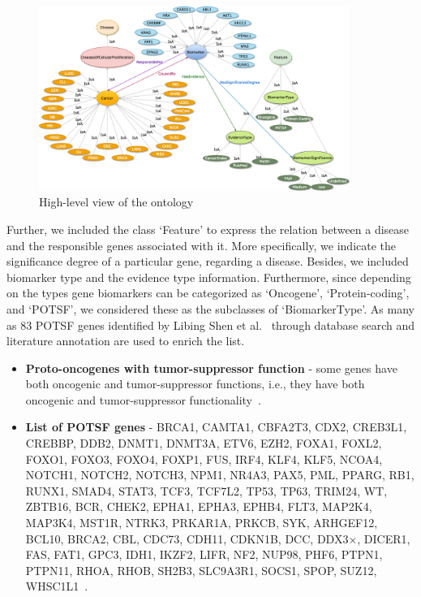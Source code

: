 \begin{figure}
	\centering
	\includegraphics[width=0.8\linewidth,height=60mm]{images/diagram_general_view.png}
	\caption{High-level view of the ontology} 
	\label{fig:main_ontology}
\end{figure}

\hspace*{3.5mm} Further, we included the class `Feature' to express the relation between a disease and the responsible genes associated with it. More specifically, we indicate the significance degree of a particular gene, regarding a disease. Besides, we included biomarker type and the evidence type information. Furthermore, since depending on the types gene biomarkers can be categorized as `Oncogene', `Protein-coding', and `POTSF', we considered these as the subclasses of `BiomarkerType'. As many as 83 POTSF genes identified by Libing Shen et al.~\cite{POSTF} through database search and literature annotation are used to enrich the list. 

\begin{itemize}[noitemsep]
    \item \textbf{Proto-oncogenes with tumor-suppressor function} - some genes have both oncogenic and tumor-suppressor functions, i.e., they have both oncogenic and tumor-suppressor functionality~\cite{POSTF}.
    \item \textbf{List of POTSF genes} - BRCA1, CAMTA1, CBFA2T3, CDX2, CREB3L1, CREBBP, DDB2, DNMT1, DNMT3A, ETV6, EZH2, FOXA1, FOXL2, FOXO1, FOXO3, FOXO4, FOXP1, FUS, IRF4, KLF4, KLF5, NCOA4, NOTCH1, NOTCH2, NOTCH3, NPM1, NR4A3, PAX5, PML, PPARG, RB1, RUNX1, SMAD4, STAT3, TCF3, TCF7L2, TP53, TP63, TRIM24, WT, ZBTB16, BCR, CHEK2, EPHA1, EPHA3, EPHB4, FLT3, MAP2K4, MAP3K4, MST1R, NTRK3, PRKAR1A, PRKCB, SYK, ARHGEF12, BCL10, BRCA2, CBL, CDC73, CDH11, CDKN1B, DCC, DDX3×, DICER1, FAS, FAT1, GPC3, IDH1, IKZF2, LIFR, NF2, NUP98, PHF6, PTPN1, PTPN11, RHOA, RHOB, SH2B3, SLC9A3R1, SOCS1, SPOP, SUZ12, WHSC1L1~\cite{POSTF}. 
\end{itemize}

